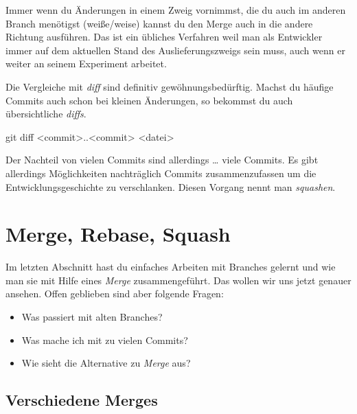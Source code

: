 \documentclass[
  letterpaper,
  DIV=11]{scrreprt}
\newenvironment{Shaded}{\begin{snugshade}}{\end{snugshade}}
\newcommand{\FunctionTok}[1]{\textcolor[rgb]{0.28,0.35,0.67}{#1}}
\newcommand{\NormalTok}[1]{\textcolor[rgb]{0.00,0.23,0.31}{#1}}
\newcommand{\OperatorTok}[1]{\textcolor[rgb]{0.37,0.37,0.37}{#1}}
\providecommand{\tightlist}{%
  \setlength{\itemsep}{0pt}\setlength{\parskip}{0pt}}\usepackage{longtable,booktabs,array}
\begin{document}
Immer wenn du Änderungen in einem Zweig vornimmst, die du auch im
anderen Branch menötigst (weiße/weise) kannst du den Merge auch in die
andere Richtung ausführen. Das ist ein übliches Verfahren weil man als
Entwickler immer auf dem aktuellen Stand des Auslieferungszweigs sein
muss, auch wenn er weiter an seinem Experiment arbeitet.

Die Vergleiche mit \emph{diff} sind definitiv gewöhnungsbedürftig.
Machst du häufige Commits auch schon bei kleinen Änderungen, so bekommst
du auch übersichtliche \emph{diffs}.

\begin{Shaded}
\begin{Highlighting}[]
\FunctionTok{git}\NormalTok{ diff }\OperatorTok{\textless{}}\NormalTok{commit}\OperatorTok{\textgreater{}}\NormalTok{..}\OperatorTok{\textless{}}\NormalTok{commit}\OperatorTok{\textgreater{}} \OperatorTok{\textless{}}\NormalTok{datei}\OperatorTok{\textgreater{}}
\end{Highlighting}
\end{Shaded}

Der Nachteil von vielen Commits sind allerdings \ldots{} viele Commits.
Es gibt allerdings Möglichkeiten nachträglich Commits zusammenzufassen
um die Entwicklungsgeschichte zu verschlanken. Diesen Vorgang nennt man
\emph{squashen}.


\chapter{Merge, Rebase, Squash}\label{merge-rebase-squash}

Im letzten Abschnitt hast du einfaches Arbeiten mit Branches gelernt und
wie man sie mit Hilfe eines \emph{Merge} zusammengeführt. Das wollen wir
uns jetzt genauer ansehen. Offen geblieben sind aber folgende Fragen:

\begin{itemize}
\tightlist
\item
  Was passiert mit alten Branches?
\item
  Was mache ich mit zu vielen Commits?
\item
  Wie sieht die Alternative zu \emph{Merge} aus?
\end{itemize}

\section{Verschiedene Merges}\label{verschiedene-merges}
\end{document}
